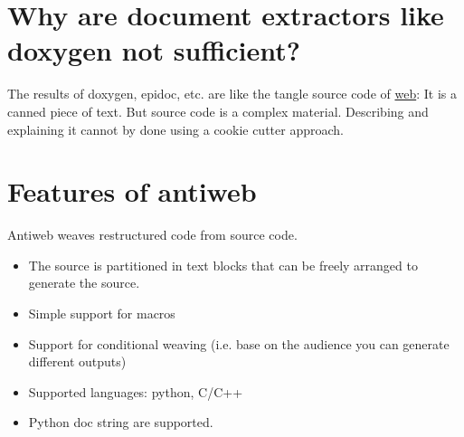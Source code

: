 \documentclass[letterpaper,10pt,english]{sphinxmanual}
\begin{document}
\section{Why are document extractors like doxygen not sufficient?}
\label{motivation:why-are-document-extractors-like-doxygen-not-sufficient}
The results of doxygen, epidoc, etc. are like the tangle source code of
\href{http://en.wikipedia.org/wiki/WEB}{web}: It is a canned piece of text. But source code is a complex material.
Describing and explaining it cannot by done using a cookie cutter approach.


\section{Features of antiweb}
\label{motivation:features-of-antiweb}
Antiweb weaves restructured code from source code.
\begin{itemize}
\item {} 
The source is partitioned in text blocks that can
be freely arranged to generate the source.

\item {} 
Simple support for macros

\item {} 
Support for conditional weaving (i.e. base on the
audience you can generate different outputs)

\item {} 
Supported languages: python, C/C++

\item {} 
Python doc string are supported.

\end{itemize}



\renewcommand{\indexname}{Index}
\printindex
\end{document}
